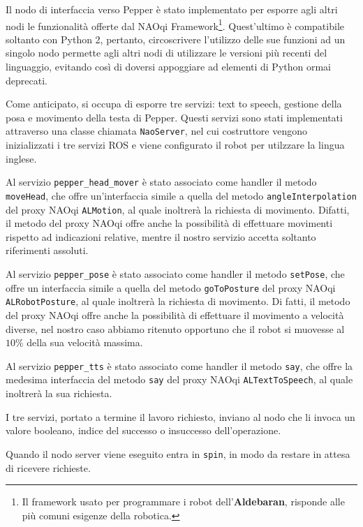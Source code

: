 Il nodo di interfaccia verso Pepper è stato implementato per esporre agli altri nodi le funzionalità offerte dal NAOqi Framework\footnote{Il framework usato per programmare i robot dell'\textbf{Aldebaran}, risponde alle più comuni esigenze della robotica.}. Quest'ultimo è compatibile soltanto con Python 2, pertanto, circoscrivere l'utilizzo delle sue funzioni ad un singolo nodo permette agli altri nodi di utilizzare le versioni più recenti del linguaggio, evitando così di doversi appoggiare ad elementi di Python ormai deprecati. 

Come anticipato, si occupa di esporre tre servizi: text to speech, gestione della posa e movimento della testa di Pepper. 
Questi servizi sono stati implementati attraverso una classe chiamata \verb|NaoServer|, nel cui costruttore vengono inizializzati i tre servizi ROS e viene configurato il robot per utilzzare la lingua inglese.

Al servizio \verb|pepper_head_mover| è stato associato come handler il metodo \verb|moveHead|, che offre un'interfaccia simile a quella del metodo \verb|angleInterpolation| del proxy NAOqi \verb|ALMotion|, al quale inoltrerà la richiesta di movimento. Difatti, il metodo del proxy NAOqi offre anche la possibilità di effettuare movimenti rispetto ad indicazioni relative, mentre il nostro servizio accetta soltanto riferimenti assoluti.

Al servizio \verb|pepper_pose| è stato associato come handler il metodo \verb|setPose|, che offre un interfaccia simile a quella del metodo \verb|goToPosture| del proxy NAOqi \verb|ALRobotPosture|, al quale inoltrerà la richiesta di movimento. Di fatti, il metodo del proxy NAOqi offre anche la possibilità di effettuare il movimento a velocità diverse, nel nostro caso abbiamo ritenuto opportuno che il robot si muovesse al $10\%$ della sua velocità massima.

Al servizio \verb|pepper_tts| è stato associato come handler il metodo \verb|say|, che offre la medesima interfaccia del metodo \verb|say| del proxy NAOqi \verb|ALTextToSpeech|, al quale inoltrerà la sua richiesta.

I tre servizi, portato a termine il lavoro richiesto, inviano al nodo che li invoca un valore booleano, indice del successo o insuccesso dell'operazione.

Quando il nodo server viene eseguito entra in \verb|spin|, in modo da restare in attesa di ricevere richieste. 

